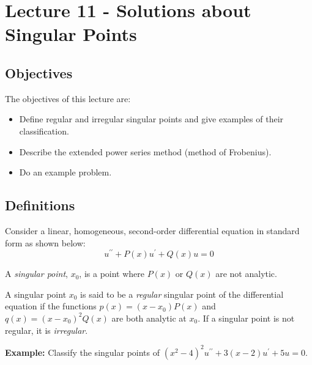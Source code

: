 \chapter{Lecture 11 - Solutions about Singular Points}
\label{ch:lec11}
\section{Objectives}
The objectives of this lecture are:
\begin{itemize}
\item Define regular and irregular singular points and give examples of their classification.
\item Describe the extended power series method (method of Frobenius).
\item Do an example problem.
\end{itemize}

\section{Definitions}
Consider a linear, homogeneous, second-order differential equation in standard form as shown below:
\begin{equation*}
u^{\prime \prime} + P(x)u^{\prime} + Q(x)u = 0
\end{equation*}

\begin{definition}
A \emph{singular point}, $x_0$, is a point where $P(x)$ or $Q(x)$ are not analytic.
\end{definition}

\begin{definition}
A singular point $x_0$ is said to be a \emph{regular} singular point of the differential equation if the functions $p(x)=(x-x_0)P(x)$ and $q(x)=(x-x_0)^2Q(x)$ are both analytic at $x_0$.  If a singular point is not regular, it is \emph{irregular}.
\end{definition}

\noindent\textbf{Example:} Classify the singular points of $(x^2-4)^2u^{\prime\prime}+3(x-2)u^{\prime}+5u = 0$.

\vspace{0.5cm}

